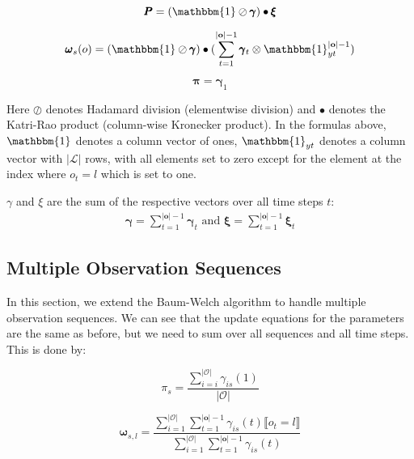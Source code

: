 \begin{equation}
    \pmb{P}
    = (\mathbbm{1} \oslash \pmb{\gamma}) \bullet \pmb{\xi}
    \label{eq:transition-probabilities-multiple-sequences}
\end{equation}

\begin{equation}
    \pmb{\omega}
    _s(o) = (\mathbbm{1} \oslash \pmb{\gamma}) \bullet (\sum_{t=1}^{|\mathbf{o}|-1} \pmb{\gamma}_t \otimes \mathbbm{1}_{yt}^{|\mathbf{o}|-1})
    \label{eq:omega-multiple-sequences}
\end{equation}

\begin{equation}
    \pmb{\pi}
    = \pmb{\gamma}_1
    \label{eq:initial-probabilities-multiple-sequences}
\end{equation}

Here $\oslash$ denotes Hadamard division (elementwise division) and $\bullet$ denotes the Katri-Rao product (column-wise Kronecker product).
In the formulas above, $\mathbbm{1}$ denotes a column vector of ones, $\mathbbm{1}_{yt}$ denotes a column vector with $|\mathcal{L}|$ rows, with all elements set to zero except for the element at the index where $o_t = l$ which is set to one.

$\gamma$ and $\xi$ are the sum of the respective vectors over all time steps $t$:
\begin{align}
    \pmb{\gamma} = \sum_{t=1}^{|\mathbf{o}|-1} \pmb{\gamma}_t
    \text{ and }
    \pmb{\xi} = \sum_{t=1}^{|\mathbf{o}|-1} \pmb{\xi}_t
\end{align}

\subsection{Multiple Observation Sequences}\label{subsec:multiple-observation-sequences}
In this section, we extend the Baum-Welch algorithm to handle multiple observation sequences.
We can see that the update equations for the parameters are the same as before, but we need to sum over all sequences and all time steps.
This is done by:

\begin{equation}
    \pi_s = \frac{\sum_{i=i}^{|\mathcal{O}|} \gamma_{is}(1) }{|\mathcal{O}|}
\end{equation}

\begin{equation}
    \pmb{\omega}_{s, l} = \frac{\sum_{i=1}^{|\mathcal{O}|} \sum_{t=1}^{|\mathbf{o}|-1} \gamma_{is}(t) \lBrack o_t = l \rBrack}{\sum_{i=1}^{|\mathcal{O}|} \sum_{t=1}^{|\mathbf{o}|-1} \gamma_{is}(t)}
\end{equation}

